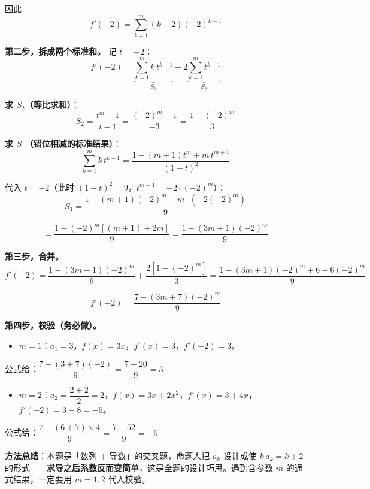 \begin{answer}
因此
\nopagebreak[4]
\[f'(-2)=\sum_{k=1}^{m}(k+2)(-2)^{k-1}\]

\textbf{第二步，拆成两个标准和。} 记 $t=-2$：
\nopagebreak[4]
\[f'(-2)=\underbrace{\sum_{k=1}^{m}k\,t^{k-1}}_{S_1}+2\underbrace{\sum_{k=1}^{m}t^{k-1}}_{S_2}\]

\textbf{求 $S_2$（等比求和）}：
\nopagebreak[4]
\[S_2=\frac{t^m-1}{t-1}=\frac{(-2)^m-1}{-3}=\frac{1-(-2)^m}{3}\]

\textbf{求 $S_1$（错位相减的标准结果）}：
\nopagebreak[4]
\[\sum_{k=1}^{m}k\,t^{k-1}=\frac{1-(m+1)t^{m}+m\,t^{m+1}}{(1-t)^2}\]

代入 $t=-2$（此时 $(1-t)^2=9$，$t^{m+1}=-2\cdot(-2)^m$）：
\nopagebreak[4]
\[S_1=\frac{1-(m+1)(-2)^m+m\cdot\left(-2(-2)^m\right)}{9}\]

\nopagebreak[4]
\[=\frac{1-(-2)^m\left[(m+1)+2m\right]}{9}=\frac{1-(3m+1)(-2)^m}{9}\]

\textbf{第三步，合并。}
\nopagebreak[4]
\[f'(-2)=\frac{1-(3m+1)(-2)^m}{9}+\frac{2\left[1-(-2)^m\right]}{3}=\frac{1-(3m+1)(-2)^m+6-6(-2)^m}{9}\]

\nopagebreak[4]
\[\boxed{f'(-2)=\frac{7-(3m+7)(-2)^m}{9}}\]

\textbf{第四步，校验（务必做）。}

\begin{itemize}
\item $m=1$：$a_1=3$，$f(x)=3x$，$f'(x)=3$，$f'(-2)=3$。
\end{itemize}
  公式给：$\dfrac{7-(3+7)(-2)}{9}=\dfrac{7+20}{9}=3$ 
\begin{itemize}
\item $m=2$：$a_2=\dfrac{2+2}{2}=2$，$f(x)=3x+2x^2$，$f'(x)=3+4x$，$f'(-2)=3-8=-5$。
\end{itemize}
  公式给：$\dfrac{7-(6+7)\times4}{9}=\dfrac{7-52}{9}=-5$ 

\begin{gktip}
\textbf{方法总结}：本题是「数列 + 导数」的交叉题，命题人把 $a_k$ 设计成使 $k\,a_k=k+2$ 的形式——\textbf{求导之后系数反而变简单}，这是全题的设计巧思。遇到含参数 $m$ 的通式结果，一定要用 $m=1,2$ 代入校验。
\end{gktip}



\par\medskip

\end{answer}
